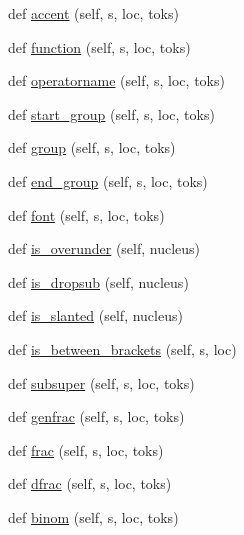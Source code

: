 \begin{DoxyCompactItemize}
\item 
def \hyperlink{classmatplotlib_1_1__mathtext_1_1Parser_a70ad7c6b16ad65e6f88ef736037e1572}{accent} (self, s, loc, toks)
\item 
def \hyperlink{classmatplotlib_1_1__mathtext_1_1Parser_a3a8335368d6245cde83a7e3c3bbe3478}{function} (self, s, loc, toks)
\item 
def \hyperlink{classmatplotlib_1_1__mathtext_1_1Parser_a9cacc1ab759b2be13a713b72c222f5aa}{operatorname} (self, s, loc, toks)
\item 
def \hyperlink{classmatplotlib_1_1__mathtext_1_1Parser_a4286d5521a969a3de2e3cd0918bf5703}{start\+\_\+group} (self, s, loc, toks)
\item 
def \hyperlink{classmatplotlib_1_1__mathtext_1_1Parser_ace87af37200466779f925c78cd9bab49}{group} (self, s, loc, toks)
\item 
def \hyperlink{classmatplotlib_1_1__mathtext_1_1Parser_a9495df696d925a7a175c91242b725a70}{end\+\_\+group} (self, s, loc, toks)
\item 
def \hyperlink{classmatplotlib_1_1__mathtext_1_1Parser_a8e8ab6c7fabea32ab0c3642990f5a576}{font} (self, s, loc, toks)
\item 
def \hyperlink{classmatplotlib_1_1__mathtext_1_1Parser_ae76b6bdea9afc523477bae2ee3c594fe}{is\+\_\+overunder} (self, nucleus)
\item 
def \hyperlink{classmatplotlib_1_1__mathtext_1_1Parser_a95968be05edea144f837623949379079}{is\+\_\+dropsub} (self, nucleus)
\item 
def \hyperlink{classmatplotlib_1_1__mathtext_1_1Parser_ad5e984e3a214c354f18563031ba42732}{is\+\_\+slanted} (self, nucleus)
\item 
def \hyperlink{classmatplotlib_1_1__mathtext_1_1Parser_aedc79c5e502ab456e277d3e43eb29a3e}{is\+\_\+between\+\_\+brackets} (self, s, loc)
\item 
def \hyperlink{classmatplotlib_1_1__mathtext_1_1Parser_a57c5ddd4dc76304aa14f256d7bc2d25f}{subsuper} (self, s, loc, toks)
\item 
def \hyperlink{classmatplotlib_1_1__mathtext_1_1Parser_a16653ad7c69c8e93087fa4ee3699b37c}{genfrac} (self, s, loc, toks)
\item 
def \hyperlink{classmatplotlib_1_1__mathtext_1_1Parser_a2f8137ba325af21b40fae11b48a698b5}{frac} (self, s, loc, toks)
\item 
def \hyperlink{classmatplotlib_1_1__mathtext_1_1Parser_a2d09869b69b9dbf0496d668f82edf6f2}{dfrac} (self, s, loc, toks)
\item 
def \hyperlink{classmatplotlib_1_1__mathtext_1_1Parser_a990e022c764a4f33bb4d146a320d1419}{binom} (self, s, loc, toks)

\end{DoxyCompactItemize}
